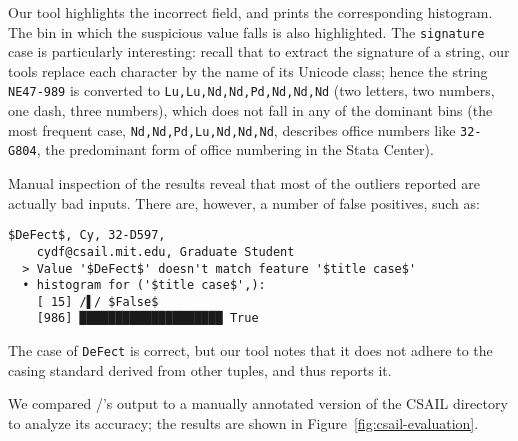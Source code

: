 Our tool highlights the incorrect field, and prints the corresponding histogram. The bin in which the suspicious value falls is also highlighted. The \texttt{signature} case is particularly interesting: recall that to extract the signature of a string, our tools replace each character by the name of its Unicode class; hence the string \texttt{NE47-989} is converted to \lstinline{Lu,Lu,Nd,Nd,Pd,Nd,Nd,Nd} (two letters, two numbers, one dash, three numbers), which does not fall in any of the dominant bins (the most frequent case, \lstinline{Nd,Nd,Pd,Lu,Nd,Nd,Nd}, describes office numbers like \lstinline{32-G804}, the predominant form of office numbering in the Stata Center).

Manual inspection of the results reveal that most of the outliers reported are actually bad inputs. There are, however, a number of false positives, such as:

\begin{lstlisting}[gobble=2]
  $DeFect$, Cy, 32-D597,
    cydf@csail.mit.edu, Graduate Student
  > Value '$DeFect$' doesn't match feature '$title case$'
  • histogram for ('$title case$',):
    [ 15] /▌/ $False$
    [986] ████████████████████ True
\end{lstlisting}

The case of \lstinline{DeFect} is correct, but our tool notes that it does not adhere to the casing standard derived from other tuples, and thus reports it.

We compared \dBoost/'s output to a manually annotated version of the CSAIL directory to analyze its accuracy; the results are shown in Figure~\ref{fig:csail-evaluation}.

